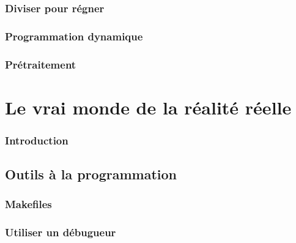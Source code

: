 \documentclass{minitelreport}
\begin{document}
\begin{refsection}
		\section{Diviser pour régner}
			\label{sec:diviser_pour_r_gner}
			
		\section{Programmation dynamique}
			\label{sec:programmation_dynamique}
			
		\section{Prétraitement}
			\label{sec:pr_traitement}
			
\part{Le vrai monde de la réalité réelle}
\label{part:le_vrai_monde_de_la_réalité_réelle}
	\section*{Introduction}
	
	\chapter{Outils à la programmation}
	\label{chap:outils}
		\section{Makefiles}
			\label{sec:makefiles}
			
		\section{Utiliser un débugueur}
			\label{sec:utiliser_un_d_bugueur}
			

\end{refsection}
\end{document}
